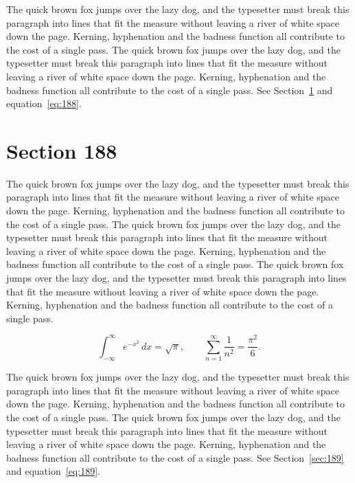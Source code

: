 \documentclass{article}
\begin{document}
The quick brown fox jumps over the lazy dog, and the typesetter must break this paragraph into lines that fit the measure without leaving a river of white space down the page. Kerning, hyphenation and the badness function all contribute to the cost of a single pass. The quick brown fox jumps over the lazy dog, and the typesetter must break this paragraph into lines that fit the measure without leaving a river of white space down the page. Kerning, hyphenation and the badness function all contribute to the cost of a single pass. 
See Section~\ref{sec:188} and equation~\eqref{eq:188}.
\section{Section 188}
\label{sec:188}
The quick brown fox jumps over the lazy dog, and the typesetter must break this paragraph into lines that fit the measure without leaving a river of white space down the page. Kerning, hyphenation and the badness function all contribute to the cost of a single pass. The quick brown fox jumps over the lazy dog, and the typesetter must break this paragraph into lines that fit the measure without leaving a river of white space down the page. Kerning, hyphenation and the badness function all contribute to the cost of a single pass. The quick brown fox jumps over the lazy dog, and the typesetter must break this paragraph into lines that fit the measure without leaving a river of white space down the page. Kerning, hyphenation and the badness function all contribute to the cost of a single pass. 

\begin{equation}\label{eq:188}
\int_{-\infty}^{\infty} e^{-x^{2}}\,dx = \sqrt{\pi}, \qquad
\sum_{n=1}^{\infty} \frac{1}{n^{2}} = \frac{\pi^{2}}{6}.
\end{equation}

The quick brown fox jumps over the lazy dog, and the typesetter must break this paragraph into lines that fit the measure without leaving a river of white space down the page. Kerning, hyphenation and the badness function all contribute to the cost of a single pass. The quick brown fox jumps over the lazy dog, and the typesetter must break this paragraph into lines that fit the measure without leaving a river of white space down the page. Kerning, hyphenation and the badness function all contribute to the cost of a single pass. 
See Section~\ref{sec:189} and equation~\eqref{eq:189}.
\end{document}
